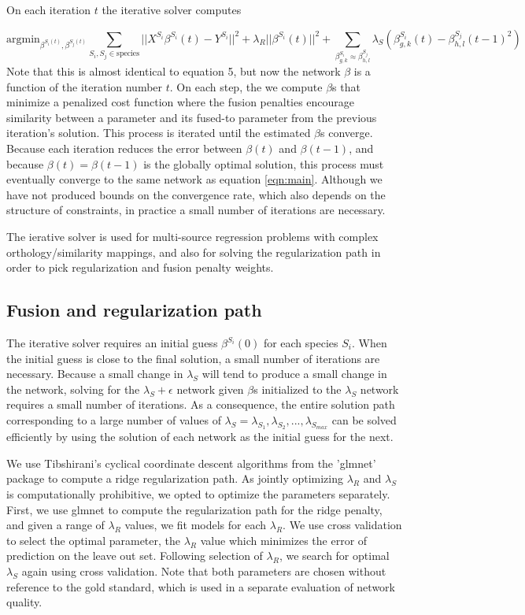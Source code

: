 \documentclass[11pt]{article}
\begin{document}
On each iteration $t$ the iterative solver computes


\begin{equation}
\text{argmin}_{\beta^{S_i(t)}, \beta^{S_j(t)}} \displaystyle\sum_{S_i, S_j \in \text{species}} ||X^{S_i}\beta^{S_i}(t) - Y^{S_i}||^2 + \lambda_R||\beta^{S_i}(t)||^2 + \displaystyle \sum_{\beta_{g,k}^{S_i} \approx \beta_{h,l}^{S_j}} \lambda_S(\beta^{S_i}_{g,k}(t) - \beta_{h,l}^{S_j}(t-1)^2)
\end{equation}
Note that this is almost identical to equation 5, but now the network $\beta$ is a function of the iteration number $t$. On each step, the we compute $\beta$s that minimize a penalized cost function where the fusion penalties encourage similarity between a parameter and its fused-to parameter from the previous iteration's solution. This process is iterated until the estimated $\beta$s converge. Because each iteration reduces the error between $\beta(t)$ and $\beta(t-1)$, and because $\beta(t) = \beta(t-1)$ is the globally optimal solution, this process must eventually converge to the same network as equation \ref{eqn:main}. Although we have not produced bounds on the convergence rate, which also depends on the structure of constraints, in practice a small number of iterations are necessary.

The ierative solver is used for multi-source regression problems with complex orthology/similarity mappings, and also for solving the regularization path in order to pick regularization and fusion penalty weights. 

\subsection{Fusion and regularization path}
The iterative solver requires an initial guess $\beta^{S_i}(0)$ for each species $S_i$. When the initial guess is close to the final solution, a small number of iterations are necessary. Because a small change in $\lambda_S$ will tend to produce a small change in the network, solving for the $\lambda_S+\epsilon$ network given $\beta$s initialized to the $\lambda_S$ network requires a small number of iterations. As a consequence, the entire solution path corresponding to a large number of values of $\lambda_S= \lambda_{S_1}, \lambda_{S_2}, ..., \lambda_{S_{max}}$ can be solved efficiently by using the solution of each network as the initial guess for the next. 

We use Tibshirani's cyclical coordinate descent algorithms from the 'glmnet' package \cite{friedman_regularization_2010} to compute a ridge regularization path. As jointly optimizing $\lambda_R$ and $\lambda_S$ is computationally prohibitive, we opted to optimize the parameters separately. First, we use glmnet to compute the regularization path for the ridge penalty, and given a range of $\lambda_R$ values, we fit models for each $\lambda_R$. We use cross validation to select the optimal parameter, the $\lambda_R$ value which minimizes the error of prediction on the leave out set. Following selection of $\lambda_R$, we search for optimal $\lambda_S$ again using cross validation. Note that both parameters are chosen without reference to the gold standard, which is used in a separate evaluation of network quality. 
\end{document}
